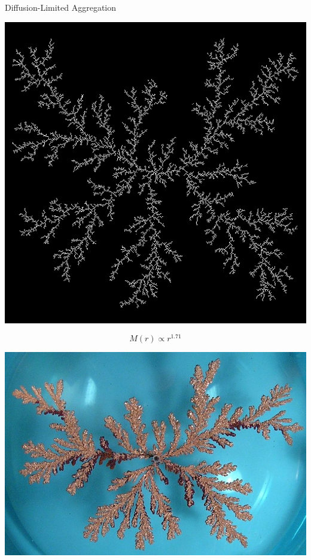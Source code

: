 \documentclass[usenames, dvipsnames, aspectratio=169]{beamer}
\begin{document}
\begin{frame}[t, c]{Diffusion-Limited Aggregation}{}
  \vfill
  \large

  \begin{minipage}{.28\textwidth}
    \includegraphics[width=\textwidth]{DLA_4}
  \end{minipage}%
  \hfill
  \begin{minipage}{.68\textwidth}
    \centering

    \[
    M(r) \propto r^{1.71}
    \]

  \end{minipage}
  
  \vfill
\end{frame}

\begin{frame}
  \vfill
  \centering

  \includegraphics[width=.75\textwidth]{dla_cluster}

  \vfill
\end{frame}
\end{document}
